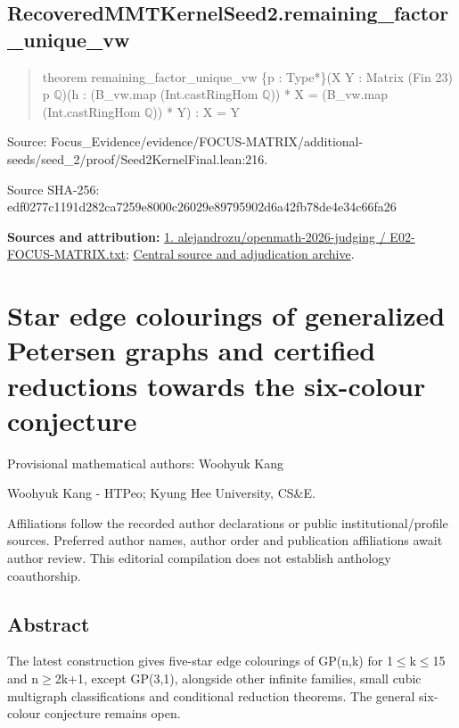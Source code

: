 \documentclass[11pt,a4paper]{article}
\begin{document}
\begin{samepage}
\subsection{RecoveredMMTKernelSeed2.remaining\_factor\_unique\_vw}
\begin{quote}\small\ttfamily theorem remaining\_factor\_unique\_vw \{p : Type*\}\newline     (X Y : Matrix (Fin 23) p \ensuremath{\mathbb{Q}})\newline     (h : (B\_vw.map (Int.castRingHom \ensuremath{\mathbb{Q}})) * X = (B\_vw.map (Int.castRingHom \ensuremath{\mathbb{Q}})) * Y) : X = Y\end{quote}
{\small Source: Focus\_Evidence/evidence/FOCUS-MATRIX/additional-seeds/seed\_2/proof/Seed2KernelFinal.lean:216.\par}

{\small Source SHA-256: edf0277c1191d282ca7259e8000c26029e89795902d6a42fb78de4e34c66fa26\par}

{\small\textbf{Sources and attribution:} \href{https://github.com/alejandrozu/openmath-2026-judging/blob/d0ed487f487fa7ec814ff705ab55249983fe8707/OpenMath-Judging/review/entries/E02-FOCUS-MATRIX.txt}{1. alejandrozu/openmath-2026-judging / E02-FOCUS-MATRIX.txt}; \href{https://github.com/alejandrozu/openmath-2026-judging}{Central source and adjudication archive}.\par}

\end{samepage}
\clearpage
\section{Star edge colourings of generalized Petersen graphs and certified reductions towards the six-colour conjecture}
{\small Provisional mathematical authors: Woohyuk Kang\par}\medskip
{\small Woohyuk Kang  -  HTPeo; Kyung Hee University, CS\&E.\par}

{\small Affiliations follow the recorded author declarations or public institutional/profile sources. Preferred author names, author order and publication affiliations await author review. This editorial compilation does not establish anthology coauthorship.\par}

\subsection{Abstract}
The latest construction gives five-star edge colourings of GP(n,k) for 1\ensuremath{\leq}k\ensuremath{\leq}15 and n\ensuremath{\geq}2k+1, except GP(3,1), alongside other infinite families, small cubic multigraph classifications and conditional reduction theorems. The general six-colour conjecture remains open.
\end{document}
